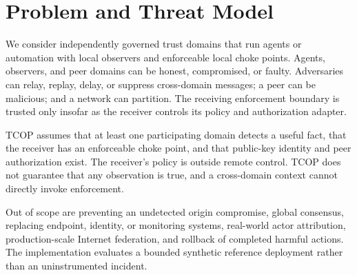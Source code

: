 \section{Problem and Threat Model}

We consider independently governed trust domains that run agents or automation with local observers and enforceable local choke points. Agents, observers, and peer domains can be honest, compromised, or faulty. Adversaries can relay, replay, delay, or suppress cross-domain messages; a peer can be malicious; and a network can partition. The receiving enforcement boundary is trusted only insofar as the receiver controls its policy and authorization adapter.

TCOP assumes that at least one participating domain detects a useful fact, that the receiver has an enforceable choke point, and that public-key identity and peer authorization exist. The receiver's policy is outside remote control. TCOP does not guarantee that any observation is true, and a cross-domain context cannot directly invoke enforcement.

Out of scope are preventing an undetected origin compromise, global consensus, replacing endpoint, identity, or monitoring systems, real-world actor attribution, production-scale Internet federation, and rollback of completed harmful actions. The implementation evaluates a bounded synthetic reference deployment rather than an uninstrumented incident.
